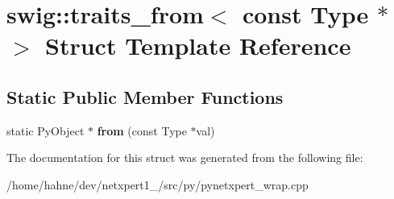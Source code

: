 \hypertarget{structswig_1_1traits__from_3_01const_01Type_01_5_01_4}{}\section{swig\+:\+:traits\+\_\+from$<$ const Type $\ast$ $>$ Struct Template Reference}
\label{structswig_1_1traits__from_3_01const_01Type_01_5_01_4}
\subsection*{Static Public Member Functions}
\begin{DoxyCompactItemize}
\item 
static Py\+Object $\ast$ {\bfseries from} (const Type $\ast$val)\hypertarget{structswig_1_1traits__from_3_01const_01Type_01_5_01_4_ae36dbdb3c905af0dab508e7bf360a8d6}{}\label{structswig_1_1traits__from_3_01const_01Type_01_5_01_4_ae36dbdb3c905af0dab508e7bf360a8d6}

\end{DoxyCompactItemize}


The documentation for this struct was generated from the following file\+:\begin{DoxyCompactItemize}
\item 
/home/hahne/dev/netxpert1\+\_/src/py/pynetxpert\+\_\+wrap.\+cpp\end{DoxyCompactItemize}
